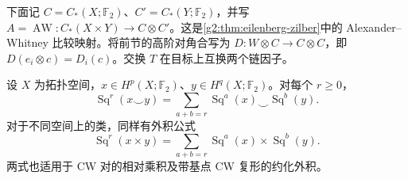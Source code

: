 下面记 \(C=C_*(X;\mathbb F_2)\)、\(C'=C_*(Y;\mathbb F_2)\)，并写 \(A=\operatorname{AW}:C_*(X\times Y)\to C\otimes C'\)。这是\cref{g2:thm:eilenberg-zilber}中的 Alexander--Whitney 比较映射。将前节的高阶对角合写为 \(D:W\otimes C\to C\otimes C\)，即 \(D(e_i\otimes c)=D_i(c)\)。交换 \(T\) 在目标上互换两个链因子。

\begin{theorem}[Cartan 公式]\label{g2:thm:steenrod-cartan}
	设 \(X\) 为拓扑空间，\(x\in H^p(X;\mathbb F_2)\)、\(y\in H^q(X;\mathbb F_2)\)。对每个 \(r\ge0\)，
	\begin{equation}\label{g2:eq:steenrod-cartan}
		\operatorname{Sq}^r(x\smile y)=\sum_{a+b=r}\operatorname{Sq}^a(x)\smile\operatorname{Sq}^b(y).
	\end{equation}
	对于不同空间上的类，同样有外积公式
	\begin{equation}\label{g2:eq:steenrod-external-cartan}
		\operatorname{Sq}^r(x\times y)=\sum_{a+b=r}\operatorname{Sq}^a(x)\times\operatorname{Sq}^b(y).
	\end{equation}
	两式也适用于 CW 对的相对乘积及带基点 CW 复形的约化外积。
\end{theorem}
